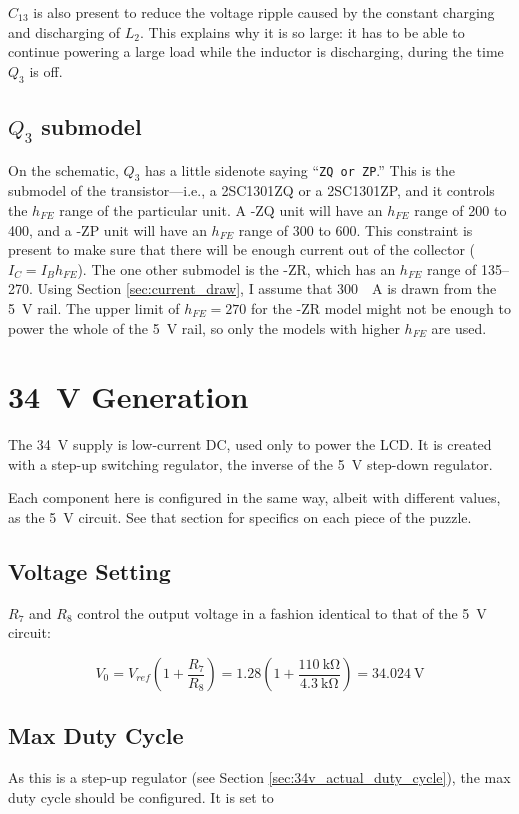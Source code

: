 \documentclass{article}
\begin{document}
$C_{13}$ is also present to reduce the voltage ripple caused by the
constant charging and discharging of $L_2$. This explains why it is so
large: it has to be able to continue powering a large load while the
inductor is discharging, during the time $Q_3$ is off.

\subsection{$Q_3$ submodel}
\label{sec:q3_submodel}
On the schematic, $Q_3$ has a little sidenote saying ``\texttt{ZQ or
  ZP}.'' This is the submodel of the transistor---i.e., a 2SC1301ZQ or
a 2SC1301ZP, and it controls the $h_{FE}$ range of the particular
unit. A -ZQ unit will have an $h_{FE}$ range of 200 to 400, and a -ZP
unit will have an $h_{FE}$ range of 300 to 600. This constraint is
present to make sure that there will be enough current out of the
collector ($I_C = I_Bh_{FE}$). The one other submodel is the -ZR,
which has an $h_{FE}$ range of 135--270. Using Section
\ref{sec:current_draw}, I assume that \qty{300}{\milli{}A} is drawn
from the \qty{5}{\volt} rail. The upper limit of $h_{FE} = 270$ for
the -ZR model might not be enough to power the whole of the
\qty{5}{\volt} rail, so only the models with higher $h_{FE}$ are used.

\section{\qty{34}{\volt} Generation}
The \qty{34}{\volt} supply is low-current DC, used only to power the
LCD. It is created with a step-up switching regulator, the inverse of
the \qty{5}{\volt} step-down regulator.

Each component here is configured in the same way, albeit with
different values, as the \qty{5}{\volt} circuit. See that section for
specifics on each piece of the puzzle.

\subsection{Voltage Setting}
$R_7$ and $R_8$ control the output voltage in a fashion identical to
that of the \qty{5}{\volt} circuit:

\begin{displaymath}
  V_0 = V_{ref}(1+\frac{R_7}{R_8}) =
  1.28(1+\frac{\qty{110}{\kilo\ohm}}{\qty{4.3}{\kilo\ohm}}) = \qty{34.024}{\volt}
\end{displaymath}

\subsection{Max Duty Cycle}
As this is a step-up regulator (see Section
\ref{sec:34v_actual_duty_cycle}), the max duty cycle should be
configured. It is set to
\end{document}
